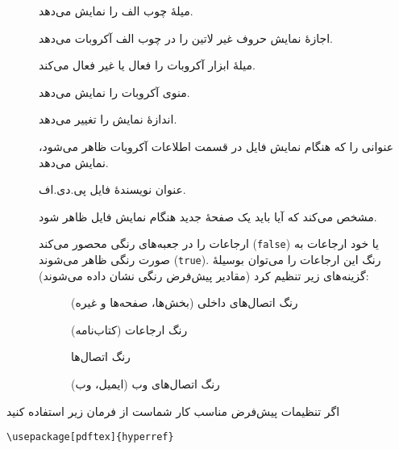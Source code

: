 {\begin{flushleft}
\begin{description}
  \item [] میلهٔ چوب الف را نمایش می‌دهد.
  \item [] اجازهٔ نمایش حروف غیر لاتین را در چوب الف آکروبات می‌دهد.
  \item [] میلهٔ ابزار آکروبات را فعال یا غیر فعال می‌کند.
  \item [] منوی آکروبات را نمایش می‌دهد.
  \item [] اندازهٔ نمایش را تغییر می‌دهد.
  \item [] عنوانی را که هنگام نمایش فایل در قسمت اطلاعات آکروبات ظاهر می‌شود، نمایش می‌دهد.
  \item [] عنوان نویسندهٔ فایل پی.دی.اف.
  \item [] مشخص می‌کند که آیا باید یک صفحهٔ جدید هنگام نمایش فایل ظاهر شود.
  \item [] ارجاعات را در جعبه‌های رنگی محصور می‌کند (\texttt{false}) یا خود ارجاعات به صورت رنگی ظاهر می‌شوند  (\texttt{true}). رنگ این ارجاعات را می‌توان بوسیلهٔ گزینه‌های زیر تنظیم کرد 
  (مقادیر پیش‌فرض رنگی نشان داده می‌شوند):
    \begin{description}
    \item [] رنگ  اتصال‌های داخلی 
    (بخش‌ها، صفحه‌ها و غیره)
    \item [] رنگ ارجاعات 
    (کتاب‌نامه)
    \item [] رنگ اتصال‌ها
    \item [] رنگ اتصال‌های وب 
    (ایمیل، وب)
    \end{description}
\end{description}
\end{flushleft}
اگر تنظیمات پیش‌فرض مناسب کار شماست از فرمان زیر استفاده کنید
\begin{code}
\begin{verbatim}
\usepackage[pdftex]{hyperref}
\end{verbatim}
\end{code}

}
